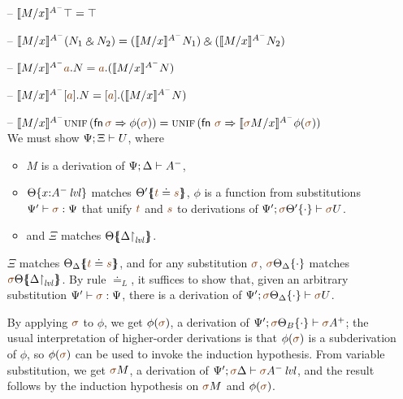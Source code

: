 \begin{itemize}
\smallskip

\item[--] $\rsubsta{M}{x}{\ttopr}{A^-} 
           = \ttopr$
\item[--] $\rsubsta{M}{x}{(\twithr{N_1}{N_2})}{A^-} 
           = \twithr{(\rsubsta{M}{x}{N_1}{A^-})}{(\rsubsta{M}{x}{N_2}{A^-})}$

\item[--] $\rsubsta{M}{x}{\texistsl{\lf a}{N}}{A^-} 
           = \texistsl{\lf a}{(\rsubsta{M}{x}{N}{A^-})}$
\item[--] $\rsubsta{M}{x}{\tforallr{\lf a}{N}}{A^-} 
           = \tforallr{\lf a}{(\rsubsta{M}{x}{N}{A^-})}$
\item[--] $\rsubsta{M}{x}{\textsc{unif}\,({\sf fn}\,\lf\sigma \Rightarrow \phi(\lf\sigma))}{A^-} 
           = \textsc{unif}\,({\sf fn}~\lf\sigma \Rightarrow 
              \rsubsta{\lf\sigma{M}}{x}{\phi(\lf\sigma)}{A^-})$\smallskip\\
  We must show $\foc{\Psi}{\Xi}{U}$, where
  \begin{itemize}
  \item $M$ is a derivation of $\foc{\Psi}{\Delta}{A^-}$, 
  \item $\tackon{\Theta}{x{:}\islvl{A^-}}$ matches 
     $\frameoff{\Theta'}{\lf t \doteq \lf s}$, $\phi$ 
     is a function from substitutions $\Psi' \vdash \lf \sigma : \Psi$
     that unify $\lf t$ and $\lf s$ to derivations of 
     $\foc{\Psi'}{\tackon{\lf \sigma\Theta'}{\cdot}}{\lf \sigma{U}}$.
  \item and $\Xi$ matches $\frameoff{\Theta}{\restrictto{\Delta}{\mlvl}}$.
  \end{itemize}

  $\Xi$ matches $\frameoff{\Theta_\Delta}{\lf t \doteq \lf s}$, and 
  for any substitution $\lf \sigma$, $\tackon{\lf \sigma\Theta_\Delta}{\cdot}$
  matches $\frameoff{\lf\sigma\Theta}{\restrictto{\Delta}{\mlvl}}$.
  By rule $\doteq_L$, it suffices to show that, given an arbitrary
  substitution $\Psi' \vdash \lf \sigma : \Psi$, there
  is a derivation of 
  $\foc{\Psi'}{\tackon{\lf\sigma\Theta_\Delta}{\cdot}}{\lf\sigma{U}}$.

  By applying $\lf\sigma$ to $\phi$, we get $\phi(\lf\sigma)$, a derivation 
  of $\foc{\Psi'}{\tackon{\lf\sigma\Theta_B}{\cdot}}{\lf\sigma{A^+}}$;
  the usual interpretation of higher-order derivations is that 
  $\phi(\lf\sigma)$ is a subderivation of $\phi$, so $\phi(\lf\sigma)$ can be
  used to invoke the induction hypothesis.
  From variable substitution, we get $\lf\sigma{M}$, a derivation
  of 
  $\foc{\Psi'}{\lf \sigma\Delta}{\islvl{\lf \sigma{A^-}}}$,
  and the result follows
  by the induction hypothesis on $\lf \sigma{M}$ and 
  $\phi(\lf \sigma)$.

\end{itemize}


